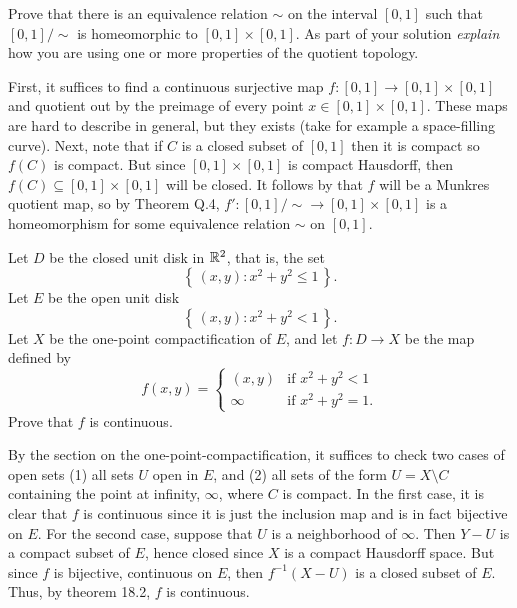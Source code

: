 \begin{problem}
  Prove that there is an equivalence relation $\sim$ on the interval
  $[0,1]$ such that $[0,1]/{\sim}$ is homeomorphic to
  $[0,1]\times[0,1]$. As part of your solution \emph{explain} how you are
  using one or more properties of the quotient topology.
\end{problem}
\begin{solution}
  First, it suffices to find a continuous surjective map
  $f\colon[0,1]\to [0,1]\times[0,1]$ and quotient out by the preimage of
  every point $x\in[0,1]\times[0,1]$. These maps are hard to describe in
  general, but they exists (take for example a space-filling curve). Next,
  note that if $C$ is a closed subset of $[0,1]$ then it is compact so
  $f(C)$ is compact. But since $[0,1]\times[0,1]$ is compact Hausdorff,
  then $f(C)\subseteq[0,1]\times[0,1]$ will be closed. It follows by that $f$
  will be a Munkres quotient map, so by Theorem Q.4,
  $f'\colon [0,1]/{\sim}\to[0,1]\times[0,1]$ is a homeomorphism for some
  equivalence relation $\sim$ on $[0,1]$.
\end{solution}

\begin{problem}
  Let $D$ be the closed unit disk in $\mathbb{R}^2$, that is, the set
  \[
    \left\{\,(x,y):x^2+y^2\leq 1\,\right\}.
  \]
  Let $E$ be the open unit disk
  \[
    \left\{\,(x,y):x^2+y^2<1\,\right\}.
  \]
  Let $X$ be the one-point compactification of $E$, and let
  $f\colon D\to X$ be the map defined by
  \[
    f(x,y)=
    \begin{cases}
      (x,y)&\text{if $x^2+y^2<1$}\\
      \infty&\text{if $x^2+y^2=1$.}
    \end{cases}
  \]
  Prove that $f$ is continuous.
\end{problem}
\begin{solution}
  By the section on the one-point-compactification, it suffices to check
  two cases of open sets (1) all sets $U$ open in $E$, and (2) all sets of
  the form $U=X\setminus C$ containing the point at infinity,
  $\infty$, where $C$ is compact. In the first case, it is clear that $f$
  is continuous since it is just the inclusion map and is in fact bijective
  on $E$. For the second case, suppose that $U$ is a neighborhood of
  $\infty$. Then $Y-U$ is a compact subset of $E$, hence closed since $X$
  is a compact Hausdorff space. But since $f$ is bijective, continuous on
  $E$, then $f^{-1}(X-U)$ is a closed subset of $E$. Thus, by theorem 18.2,
  $f$ is continuous.
\end{solution}

